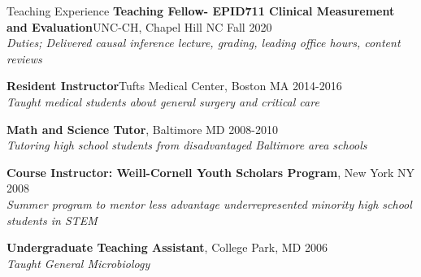 \documentclass{resume} %
\begin{document}
\begin{rSection}{Teaching Experience}
   {\bf Teaching Fellow- EPID711 Clinical Measurement and Evaluation}{UNC-CH, Chapel Hill NC} \hfill {Fall 2020}
   \\ 
   \textit{Duties; Delivered causal inference lecture, grading, leading office hours, content reviews}

   {\bf Resident Instructor}{Tufts Medical Center, Boston MA} \hfill {2014-2016}
   \\ 
   \textit{Taught medical students about general surgery and critical care}
   
   {\bf Math and Science Tutor}{, Baltimore MD} \hfill {2008-2010}
   \\ 
   \textit{Tutoring high school students from disadvantaged Baltimore area schools}
   
   {\bf Course Instructor: Weill-Cornell Youth Scholars Program}{, New York NY} \hfill {2008}
   \\ 
   \textit{Summer program to mentor less advantage underrepresented minority high school students in STEM
   } 
   
   {\bf Undergraduate Teaching Assistant}{, College Park, MD} \hfill {2006}
   \\ 
   \textit{Taught General Microbiology}
   \end{rSection}
   
   
\end{document}
